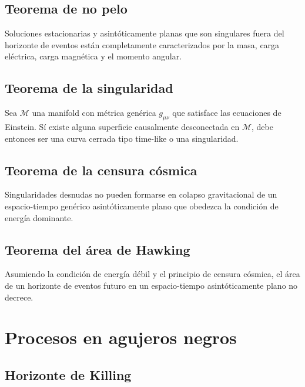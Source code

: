 \documentclass[../main]{subfiles}
\begin{document}
\subsection{Teorema de no pelo}

\teorema{} Soluciones estacionarias y asintóticamente planas que son singulares fuera del horizonte de eventos están completamente caracterizados por la masa, carga eléctrica, carga magnética y el momento angular.

\subsection{Teorema de la singularidad}

\teorema{} Sea $\mathcal{M}$ una manifold con métrica genérica $g_{\mu\nu}$ que satisface las ecuaciones de Einstein. Sí existe alguna superficie causalmente desconectada en $\mathcal{M}$, debe entonces ser una curva cerrada tipo time-like o una singularidad.

\subsection{Teorema de la censura cósmica}

\teorema{} Singularidades desnudas no pueden formarse en colapso gravitacional de un espacio-tiempo genérico asintóticamente plano que obedezca la condición de energía dominante.

\subsection{Teorema del área de Hawking}

\teorema{} Asumiendo la condición de energía débil y el principio de censura cósmica, el área de un horizonte de eventos futuro en un espacio-tiempo asintóticamente plano no decrece.

\section{Procesos en agujeros negros}

\subsection{Horizonte de Killing}
\end{document}
